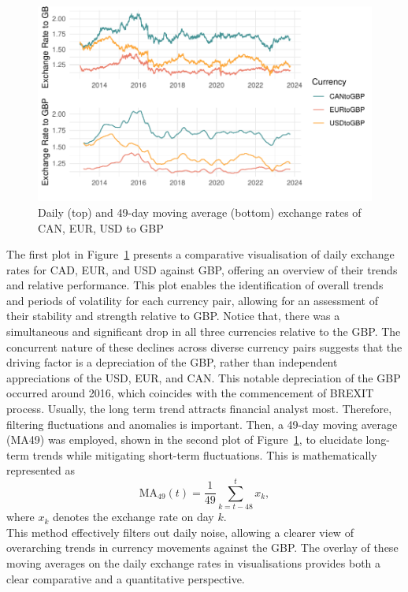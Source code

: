 \documentclass{article}\usepackage[]{graphicx}\usepackage[]{xcolor}
\makeatletter
\def\maxwidth{ %
  \ifdim\Gin@nat@width>\linewidth
    \linewidth
  \else
    \Gin@nat@width
  \fi
}
\newenvironment{knitrout}{}{} %
\numberwithin{equation}{section}
\makeatother
\begin{document}
\begin{figure}[H]
\begin{knitrout}
{\centering \includegraphics[width=\maxwidth]{figure/beamer-unnamed-chunk-2-1} 

}


\end{knitrout}
\centering
\caption{Daily (top) and 49-day moving average (bottom) exchange rates of CAN, EUR, USD to GBP}
\label{fig:all exchange rates}
\end{figure}

\noindent
The first plot in Figure~\ref{fig:all exchange rates} presents a comparative visualisation of daily exchange rates for CAD, EUR, and USD against GBP, offering an overview of their trends and relative performance. This plot enables the identification of overall trends and periods of volatility for each currency pair, allowing for an assessment of their stability and strength relative to GBP. Notice that, there was a simultaneous and significant drop in all three currencies relative to the GBP. The concurrent nature of these declines across diverse currency pairs suggests that the driving factor is a depreciation of the GBP, rather than independent appreciations of the USD, EUR, and CAN. This notable depreciation of the GBP occurred around 2016, which coincides with the commencement of BREXIT process. Usually, the long term trend attracts financial analyst most. Therefore, filtering fluctuations and anomalies is important. Then, a 49-day moving average (MA49) was employed, shown in the second plot of Figure~\ref{fig:all exchange rates}, to elucidate long-term trends while mitigating short-term fluctuations. This is mathematically represented as 
\[\text{MA}_{49}(t) = \frac{1}{49} \sum_{k=t-48}^{t} x_k,\] 
where \( x_k \) denotes the exchange rate on day $k$.\\

\noindent
This method effectively filters out daily noise, allowing a clearer view of overarching trends in currency movements against the GBP. The overlay of these moving averages on the daily exchange rates in visualisations provides both a clear comparative and a quantitative perspective.\\
\end{document}

